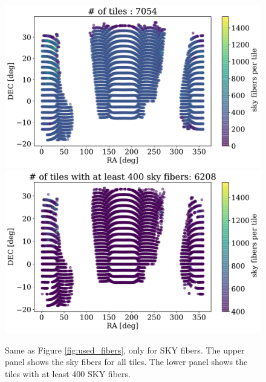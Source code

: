 \documentclass{article}
\begin{document}
\begin{figure}[!h]
\begin{center}
\begin{center}
\includegraphics[scale=0.60]{assigned_sky_ra_dec_all.pdf}
\includegraphics[scale=0.60]{assigned_sky_ra_dec_above.pdf}
\end{center}
\caption{Same as Figure \ref{fig:used_fibers}, only for SKY fibers.
The upper panel shows the sky fibers for all tiles.
The lower panel shows the tiles with at least 400 SKY fibers.
\label{fig:used_sky_fibers}}
\end{center}
\end{figure}
\end{document}
